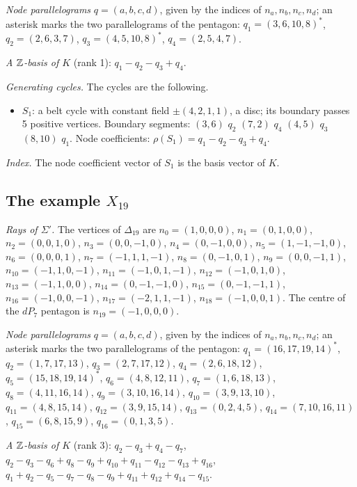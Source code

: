 \emph{Node parallelograms} $q=(a,b,c,d)$, given by the indices of $n_a,n_b,n_c,n_d$; an asterisk marks the two parallelograms of the pentagon: $q_{1}=(3,6,10,8)^{*}$, $q_{2}=(2,6,3,7)$, $q_{3}=(4,5,10,8)^{*}$, $q_{4}=(2,5,4,7)$.

\emph{A $\mathbb Z$-basis of $K$} (rank 1): $q_{1}-q_{2}-q_{3}+q_{4}$.

\emph{Generating cycles.}
The cycles are the following.
\begin{itemize}
\item $S_{1}$: a belt cycle with constant field $\pm(4,2,1,1)$, a disc; its boundary passes 5 positive vertices.
Boundary segments: $(3,6)$ $q_{2}$ $(7,2)$ $q_{4}$ $(4,5)$ $q_{3}$ $(8,10)$ $q_{1}$.
Node coefficients: $\rho(S_{1})=q_{1}-q_{2}-q_{3}+q_{4}$.
\end{itemize}
\emph{Index.} The node coefficient vector of $S_1$ is the basis vector of $K$.

\subsection{The example \texorpdfstring{$X_{19}$}{X19}}\label{app:data-x19}
\emph{Rays of $\Sigma'$.} The vertices of $\Delta_{19}$ are $n_{0}=(1,0,0,0)$, $n_{1}=(0,1,0,0)$, $n_{2}=(0,0,1,0)$, $n_{3}=(0,0,-1,0)$, $n_{4}=(0,-1,0,0)$, $n_{5}=(1,-1,-1,0)$, $n_{6}=(0,0,0,1)$, $n_{7}=(-1,1,1,-1)$, $n_{8}=(0,-1,0,1)$, $n_{9}=(0,0,-1,1)$, $n_{10}=(-1,1,0,-1)$, $n_{11}=(-1,0,1,-1)$, $n_{12}=(-1,0,1,0)$, $n_{13}=(-1,1,0,0)$, $n_{14}=(0,-1,-1,0)$, $n_{15}=(0,-1,-1,1)$, $n_{16}=(-1,0,0,-1)$, $n_{17}=(-2,1,1,-1)$, $n_{18}=(-1,0,0,1)$.
 The centre of the $dP_7$ pentagon is $n_{19}=(-1,0,0,0)$.

\emph{Node parallelograms} $q=(a,b,c,d)$, given by the indices of $n_a,n_b,n_c,n_d$; an asterisk marks the two parallelograms of the pentagon: $q_{1}=(16,17,19,14)^{*}$, $q_{2}=(1,7,17,13)$, $q_{3}=(2,7,17,12)$, $q_{4}=(2,6,18,12)$, $q_{5}=(15,18,19,14)^{*}$, $q_{6}=(4,8,12,11)$, $q_{7}=(1,6,18,13)$, $q_{8}=(4,11,16,14)$, $q_{9}=(3,10,16,14)$, $q_{10}=(3,9,13,10)$, $q_{11}=(4,8,15,14)$, $q_{12}=(3,9,15,14)$, $q_{13}=(0,2,4,5)$, $q_{14}=(7,10,16,11)$, $q_{15}=(6,8,15,9)$, $q_{16}=(0,1,3,5)$.

\emph{A $\mathbb Z$-basis of $K$} (rank 3): $q_{2}-q_{3}+q_{4}-q_{7}$, $q_{2}-q_{3}-q_{6}+q_{8}-q_{9}+q_{10}+q_{11}-q_{12}-q_{13}+q_{16}$, $q_{1}+q_{2}-q_{5}-q_{7}-q_{8}-q_{9}+q_{11}+q_{12}+q_{14}-q_{15}$.

